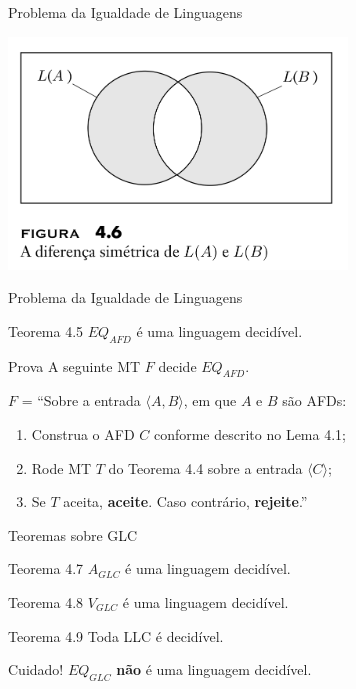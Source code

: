 \documentclass[xcolor=dvipsnames,table]{beamer}
\begin{document}
	\begin{frame}{Problema da Igualdade de Linguagens}
		\begin{center}
			\includegraphics[width=9cm]{images/fig46.png}
		\end{center}
	\end{frame}
	
	\begin{frame}{Problema da Igualdade de Linguagens}
		\begin{block}{Teorema 4.5}
			$EQ_{AFD}$ é uma linguagem decidível.
		\end{block}  
		\begin{block}{Prova}
			A seguinte MT $F$ decide $EQ_{AFD}$.
			
			$F$ = ``Sobre a entrada $\langle A, B \rangle$, em que $A$ e $B$ são AFDs:
			\begin{enumerate}
				\item Construa o AFD $C$ conforme descrito no Lema 4.1;
				\item Rode MT $T$ do Teorema 4.4 sobre a entrada $\langle C \rangle$;
				\item Se $T$ aceita, {\bf aceite}. Caso contrário, {\bf rejeite}.''
			\end{enumerate}
		\end{block}
	\end{frame}
	
	\begin{frame}{Teoremas sobre GLC}
		\begin{block}{Teorema 4.7}
			$A_{GLC}$ é uma linguagem decidível.
		\end{block}
		\begin{block}{Teorema 4.8}
			$V_{GLC}$ é uma linguagem decidível.
		\end{block}
		\begin{block}{Teorema 4.9}
			Toda LLC é decidível.
		\end{block}  
		\begin{alertblock}{Cuidado!}
			$EQ_{GLC}$ {\color{red} {\bf não}} é uma linguagem decidível.
		\end{alertblock}
	\end{frame}
	
\end{document}
